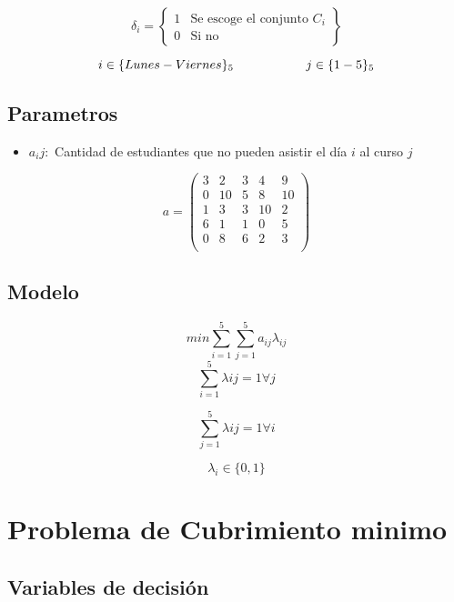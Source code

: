 \documentclass[]{article}
\begin{document}
\begin{equation*}
\delta_{i} = 
 \left\{ \begin{array}{cl}
 1 & \mbox{Se escoge el conjunto $C_i$}\\
 0 & \mbox{Si no}
 \end{array} \right\}
\end{equation*}



$$i \in \{Lunes - Viernes\}_5 \hspace*{2cm } j \in \{1-5\}_5 $$


\subsection{Parametros}

\begin{itemize}
	\item $a_ij : $ Cantidad de estudiantes que no pueden asistir el d\'ia $i$ al curso $j$ 
\end{itemize}


\begin{equation*}
	a = 
	\begin{pmatrix}
		3 & 2 & 3 & 4 & 9 \\
		0 & 10 & 5 & 8 & 10 \\
		1 & 3 & 3 & 10 & 2 \\
		6 & 1 & 1 & 0 & 5 \\
		0 & 8 & 6 & 2 & 3 \\
	\end{pmatrix}
\end{equation*}



\subsection{Modelo}
$$min \sum_{i=1}^{5} \sum_{j=1}^{5} a_{ij} \lambda_{ij}$$
$$\sum_{i=1}^{5} \lambda{ij}  = 1 \forall j$$

$$\sum_{j=1}^{5} \lambda{ij} =  1 \forall i$$

$$ \lambda_i \in \{0,1\}$$


\section{Problema de Cubrimiento minimo}
\subsection{Variables de decisi\'on}
\end{document}
